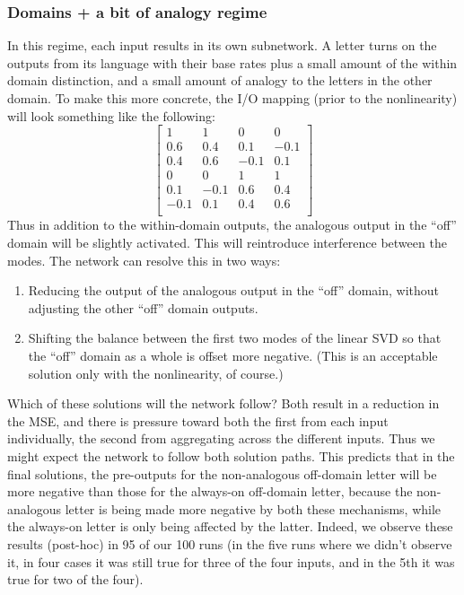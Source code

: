 \documentclass[11pt]{article}
\begin{document}
\subsubsection{Domains + a bit of analogy regime}    
In this regime, each input results in its own subnetwork. A letter turns on the outputs from its language with their base rates plus a small amount of the within domain distinction, and a small amount of analogy to the letters in the other domain. To make this more concrete, the I/O mapping (prior to the nonlinearity) will look something like the following:
\[
\left[ \begin{matrix} 
 1 & 1 & 0 & 0 \\ 
 0.6 & 0.4 & 0.1 & -0.1 \\
 0.4 & 0.6 & -0.1 & 0.1 \\
 0 & 0 & 1 & 1 \\ 
  0.1 & -0.1 & 0.6 & 0.4 \\
  -0.1 & 0.1 & 0.4 & 0.6 \\
\end{matrix}  \right] 
\]
Thus in addition to the within-domain outputs, the analogous output in the ``off'' domain will be slightly activated. This will reintroduce interference between the modes. The network can resolve this in two ways: 
\begin{enumerate}
\item Reducing the output of the analogous output in the ``off'' domain, without adjusting the other ``off'' domain outputs. 
\item Shifting the balance between the first two modes of the linear SVD so that the ``off'' domain as a whole is offset more negative. (This is an acceptable solution only with the nonlinearity, of course.)
\end{enumerate} 
Which of these solutions will the network follow? Both result in a reduction in the MSE, and there is pressure toward both the first from each input individually, the second from aggregating across the different inputs. Thus we might expect the network to follow both solution paths. This predicts that in the final solutions, the pre-outputs for the non-analogous off-domain letter will be more negative than those for the always-on off-domain letter, because the non-analogous letter is being made more negative by both these mechanisms, while the always-on letter is only being affected by the latter. Indeed, we observe these results (post-hoc) in 95 of our 100 runs (in the five runs where we didn't observe it, in four cases it was still true for three of the four inputs, and in the 5th it was true for two of the four).\par
\end{document}
